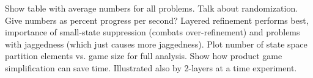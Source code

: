     Show table with average numbers for all problems.
    Talk about randomization.
    Give numbers as percent progress per second?
    Layered refinement performs best, importance of small-state suppression (combats over-refinement) and problems with jaggedness (which just causes more jaggedness).
    Plot number of state space partition elements vs. game size for full analysis.
    Show how product game simplification can save time.
    Illustrated also by 2-layers at a time experiment.

\stopsubsection

